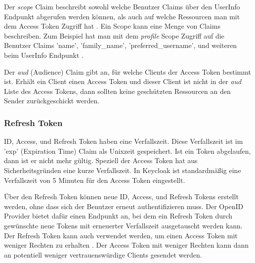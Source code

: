 Der \textit{scope} Claim beschreibt sowohl welche Benutzer Claims über den UserInfo Endpunkt abgerufen werden können, als auch auf welche Ressourcen man mit dem Access Token Zugriff hat \cite{EB11} \cite{EB7}. Ein Scope kann eine Menge von Claims beschreiben. Zum Beispiel hat man mit dem \textit{profile} Scope Zugriff auf die Benutzer Claims 'name', 'family\_name', 'preferred\_username', und weiteren beim UserInfo Endpunkt \cite{EB11}. 

Der \textit{aud} (Audience) Claim gibt an, für welche Clients der Access Token bestimmt ist. Erhält ein Client einen Access Token und dieser Client ist nicht in der \textit{aud} Liste des Access Tokens, dann sollten keine geschützten Ressourcen an den Sender zurückgeschickt werden.



\subsubsection{Refresh Token}

ID, Access, und Refresh Token haben eine Verfallszeit. Diese Verfallszeit ist im 'exp' (Expiration Time) Claim als Unixzeit gespeichert. Ist ein Token abgelaufen, dann ist er nicht mehr gültig. Speziell der Access Token hat aus Sicherheitsgründen eine kurze Verfallszeit. In Keycloak ist standardmäßig eine Verfallszeit von 5 Minuten für den Access Token eingestellt.

Über den Refresh Token können neue ID, Access, und Refresh Tokens erstellt werden, ohne dass sich der Benutzer erneut authentifizieren muss. Der OpenID Provider bietet dafür einen Endpunkt an, bei dem ein Refresh Token durch gewünschte neue Tokens mit erneuerter Verfallszeit ausgetauscht werden kann. Der Refresh Token kann auch verwendet werden, um einen Access Token mit weniger Rechten zu erhalten \cite{EB12}. Der Access Token mit weniger Rechten kann dann an potentiell weniger vertrauenswürdige Clients gesendet werden.

